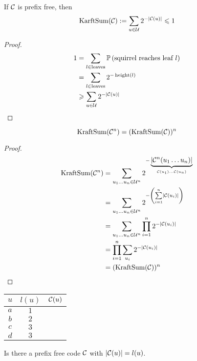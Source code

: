 \begin{theorem}
    If $\mathcal{C}$ is prefix free, then
    \[
        \operatorname{KarftSum}(\mathcal{C}) := \sum\limits_{u\in\mathcal{U}} 2^{-\lvert \mathcal{C}(u) \rvert} \leqslant 1
    \]
\end{theorem}
\begin{proof}
    \[
        \begin{aligned}
            1 &= \sum\limits_{l \in \text{leaves}} \mathbb{P}\left( \text{squirrel reaches leaf } l \right)\\
            &= \sum\limits_{l \in \text{leaves}} 2^{-\operatorname{height}(l)}\\
            &\geqslant \sum\limits_{u\in\mathcal{U}} 2^{-\lvert \mathcal{C}(u)\rvert}
        \end{aligned}
    \]
\end{proof}

\begin{proposition}
    \[
        \operatorname{KraftSum}(\mathcal{C}^n) = (\operatorname{KraftSum}(\mathcal{C}))^n
    \]
\end{proposition}
\begin{proof}
    \[
        \begin{aligned}
            \operatorname{KraftSum}(\mathcal{C}^n) &= \sum\limits_{u_1\ldots u_n\in\mathcal{U}^n} 2^{-\underbrace{\left\lvert\mathcal{C}^n(u_1\ldots u_n)\right\rvert}_{\mathcal{C}(u_1)\ldots\mathcal{C}(u_n)}}\\
            &= \sum\limits_{u_1\ldots u_n\in\mathcal{U}^n} 2^{-\left(\sum\limits_{i=1}^n\left\lvert \mathcal{C}(u_i) \right\rvert\right)}\\
            &= \sum\limits_{u_1\ldots u_n\in\mathcal{U}^n} \prod\limits_{i=1}^n 2^{-\left\lvert\mathcal{C}(u_i) \right\rvert}\\
            &= \prod\limits_{i=1}^n \sum\limits_{u_i}2^{-\left\lvert \mathcal{C}(u_i)\right\rvert}\\
            &= (\operatorname{KraftSum(\mathcal{C})})^n
        \end{aligned}
    \]
\end{proof}

\begin{example}
	\begin{center}
	    \begin{tabular}{c|c|c}
	        $u$ & $l(u)$ & $\mathcal{C}(u)$\\\hline
	        $a$ & $1$ & \\
	        $b$ & $2$ & \\
	        $c$ & $3$ & \\
	        $d$ & $3$ & \\
	    \end{tabular}
	\end{center}
	
    Is there a prefix free code $\mathcal{C}$ with $\left\lvert \mathcal{C}(u) \right\rvert = l(u)$.
\end{example}

